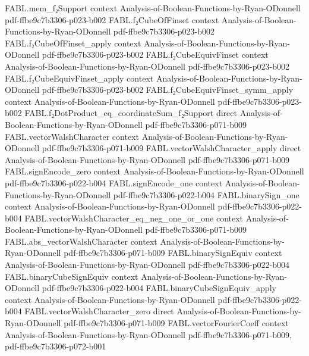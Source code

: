 \begin{theorem}
\proofstep
  {FABL.mem_f₂Support}
  {context}
  {Analysis-of-Boolean-Functions-by-Ryan-ODonnell}
  {pdf-ffbe9c7b3306-p023-b002}
\proofstep
  {FABL.f₂CubeOfFinset}
  {context}
  {Analysis-of-Boolean-Functions-by-Ryan-ODonnell}
  {pdf-ffbe9c7b3306-p023-b002}
\proofstep
  {FABL.f₂CubeOfFinset_apply}
  {context}
  {Analysis-of-Boolean-Functions-by-Ryan-ODonnell}
  {pdf-ffbe9c7b3306-p023-b002}
\proofstep
  {FABL.f₂CubeEquivFinset}
  {context}
  {Analysis-of-Boolean-Functions-by-Ryan-ODonnell}
  {pdf-ffbe9c7b3306-p023-b002}
\proofstep
  {FABL.f₂CubeEquivFinset_apply}
  {context}
  {Analysis-of-Boolean-Functions-by-Ryan-ODonnell}
  {pdf-ffbe9c7b3306-p023-b002}
\proofstep
  {FABL.f₂CubeEquivFinset_symm_apply}
  {context}
  {Analysis-of-Boolean-Functions-by-Ryan-ODonnell}
  {pdf-ffbe9c7b3306-p023-b002}
\proofstep
  {FABL.f₂DotProduct_eq_coordinateSum_f₂Support}
  {direct}
  {Analysis-of-Boolean-Functions-by-Ryan-ODonnell}
  {pdf-ffbe9c7b3306-p071-b009}
\proofstep
  {FABL.vectorWalshCharacter}
  {context}
  {Analysis-of-Boolean-Functions-by-Ryan-ODonnell}
  {pdf-ffbe9c7b3306-p071-b009}
\proofstep
  {FABL.vectorWalshCharacter_apply}
  {direct}
  {Analysis-of-Boolean-Functions-by-Ryan-ODonnell}
  {pdf-ffbe9c7b3306-p071-b009}
\proofstep
  {FABL.signEncode_zero}
  {context}
  {Analysis-of-Boolean-Functions-by-Ryan-ODonnell}
  {pdf-ffbe9c7b3306-p022-b004}
\proofstep
  {FABL.signEncode_one}
  {context}
  {Analysis-of-Boolean-Functions-by-Ryan-ODonnell}
  {pdf-ffbe9c7b3306-p022-b004}
\proofstep
  {FABL.binarySign_one}
  {context}
  {Analysis-of-Boolean-Functions-by-Ryan-ODonnell}
  {pdf-ffbe9c7b3306-p022-b004}
\proofstep
  {FABL.vectorWalshCharacter_eq_neg_one_or_one}
  {context}
  {Analysis-of-Boolean-Functions-by-Ryan-ODonnell}
  {pdf-ffbe9c7b3306-p071-b009}
\proofstep
  {FABL.abs_vectorWalshCharacter}
  {context}
  {Analysis-of-Boolean-Functions-by-Ryan-ODonnell}
  {pdf-ffbe9c7b3306-p071-b009}
\proofstep
  {FABL.binarySignEquiv}
  {context}
  {Analysis-of-Boolean-Functions-by-Ryan-ODonnell}
  {pdf-ffbe9c7b3306-p022-b004}
\proofstep
  {FABL.binaryCubeSignEquiv}
  {context}
  {Analysis-of-Boolean-Functions-by-Ryan-ODonnell}
  {pdf-ffbe9c7b3306-p022-b004}
\proofstep
  {FABL.binaryCubeSignEquiv_apply}
  {context}
  {Analysis-of-Boolean-Functions-by-Ryan-ODonnell}
  {pdf-ffbe9c7b3306-p022-b004}
\proofstep
  {FABL.vectorWalshCharacter_zero}
  {direct}
  {Analysis-of-Boolean-Functions-by-Ryan-ODonnell}
  {pdf-ffbe9c7b3306-p071-b009}
\proofstep
  {FABL.vectorFourierCoeff}
  {context}
  {Analysis-of-Boolean-Functions-by-Ryan-ODonnell}
  {pdf-ffbe9c7b3306-p071-b009,
    pdf-ffbe9c7b3306-p072-b001}

\end{theorem}
